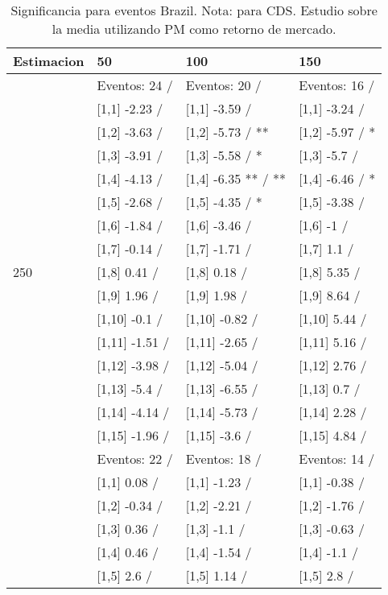 \begin{table}

\caption{Significancia para eventos Brazil. Nota: para CDS. Estudio sobre la media utilizando PM como retorno de mercado.}
\centering
\begin{tabular}[t]{llll}
\toprule
Estimacion & 50 & 100 & 150\\
\midrule
 & Eventos:  24 / & Eventos:  20 / & Eventos:  16 /\\
 & {}[1,1] -2.23  / & {}[1,1] -3.59  / & {}[1,1] -3.24  /\\
 & {}[1,2] -3.63  / & {}[1,2] -5.73  / ** & {}[1,2] -5.97  / *\\
 & {}[1,3] -3.91  / & {}[1,3] -5.58  / * & {}[1,3] -5.7  /\\
 & {}[1,4] -4.13  / & {}[1,4] -6.35 ** / ** & {}[1,4] -6.46  / *\\
\addlinespace
 & {}[1,5] -2.68  / & {}[1,5] -4.35  / * & {}[1,5] -3.38  /\\
 & {}[1,6] -1.84  / & {}[1,6] -3.46  / & {}[1,6] -1  /\\
 & {}[1,7] -0.14  / & {}[1,7] -1.71  / & {}[1,7] 1.1  /\\
250 & {}[1,8] 0.41  / & {}[1,8] 0.18  / & {}[1,8] 5.35  /\\
 & {}[1,9] 1.96  / & {}[1,9] 1.98  / & {}[1,9] 8.64  /\\
\addlinespace
 & {}[1,10] -0.1  / & {}[1,10] -0.82  / & {}[1,10] 5.44  /\\
 & {}[1,11] -1.51  / & {}[1,11] -2.65  / & {}[1,11] 5.16  /\\
 & {}[1,12] -3.98  / & {}[1,12] -5.04  / & {}[1,12] 2.76  /\\
 & {}[1,13] -5.4  / & {}[1,13] -6.55  / & {}[1,13] 0.7  /\\
 & {}[1,14] -4.14  / & {}[1,14] -5.73  / & {}[1,14] 2.28  /\\
\addlinespace
 & {}[1,15] -1.96  / & {}[1,15] -3.6  / & {}[1,15] 4.84  /\\
 & Eventos:  22 / & Eventos:  18 / & Eventos:  14 /\\
 & {}[1,1] 0.08  / & {}[1,1] -1.23  / & {}[1,1] -0.38  /\\
 & {}[1,2] -0.34  / & {}[1,2] -2.21  / & {}[1,2] -1.76  /\\
 & {}[1,3] 0.36  / & {}[1,3] -1.1  / & {}[1,3] -0.63  /\\
\addlinespace
 & {}[1,4] 0.46  / & {}[1,4] -1.54  / & {}[1,4] -1.1  /\\
 & {}[1,5] 2.6  / & {}[1,5] 1.14  / & {}[1,5] 2.8  /\\

\end{tabular}
\end{table}
